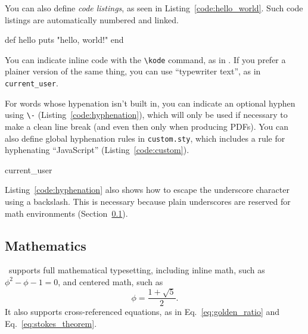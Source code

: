 You can also define \emph{code listings}, as seen in Listing~\ref{code:hello_world}. Such code listings are automatically numbered and linked.

\begin{codelisting}
\label{code:hello_world}
\begin{code}
def hello
  puts "hello, world!"
end
\end{code}
\end{codelisting}

You can indicate inline code with the \verb+\kode+ command, as in . If you prefer a plainer version of the same thing, you can use ``typewriter text'', as in \texttt{current\_\-user}.

For words whose hypenation isn't built in, you can indicate an optional hyphen using \verb+\-+ (Listing~\ref{code:hyphenation}), which will only be used if necessary to make a clean line break (and even then only when producing PDFs). You can also define global hyphenation rules in \texttt{custom.sty}, which includes a rule for hyphenating ``JavaScript'' (Listing~\ref{code:custom}).

\begin{codelisting}
\label{code:hyphenation}
\begin{code}
current\_\-user
\end{code}
\end{codelisting}

\begin{codelisting}
\label{code:custom}
\end{codelisting}

Listing~\ref{code:hyphenation} also shows how to escape the underscore character using a backslash. This is necessary because plain underscores are reserved for math environments (Section~\ref{sec:mathematics}).

\subsection{Mathematics}
\label{sec:mathematics}

\PolyTeXnic\ supports full mathematical typesetting, including inline math, such as $\phi^2 - \phi - 1 = 0$, and centered math, such as
\[ \phi = \frac{1+\sqrt{5}}{2}. \]
It also supports cross-referenced equations, as in Eq.~\eqref{eq:golden_ratio} and Eq.~\eqref{eq:stokes_theorem}.

